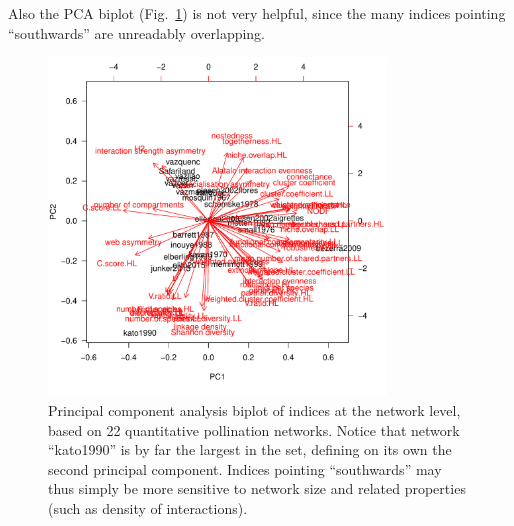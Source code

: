 \documentclass[a4paper, 11pt]{article}\usepackage[]{graphicx}\usepackage[dvipsnames]{xcolor}
\begin{document}
Also the PCA biplot (Fig.~\ref{fig:PCAnetworklevel}) is not very helpful, since the many indices pointing ``southwards'' are unreadably overlapping.
%
\begin{figure}
\centering
\includegraphics[width=0.8\textwidth]{figures/PCAnetworklevel}
\caption{Principal component analysis biplot of indices at the network level, based on 22 quantitative pollination networks. Notice that network ``kato1990'' is by far the largest in the set, defining on its own the second principal component. Indices pointing ``southwards'' may thus simply be more sensitive to network size and related properties (such as density of interactions).}
\label{fig:PCAnetworklevel}
\end{figure}
\end{document}
